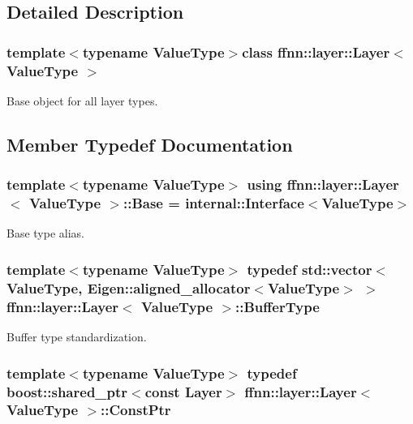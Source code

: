 \subsection{Detailed Description}
\subsubsection*{template$<$typename Value\-Type$>$class ffnn\-::layer\-::\-Layer$<$ Value\-Type $>$}

Base object for all layer types. 

\subsection{Member Typedef Documentation}
\hypertarget{classffnn_1_1layer_1_1_layer_a54b8c1b013fe141fbfc7f4dc63ab6882}{
\subsubsection[{Base}]{\setlength{\rightskip}{0pt plus 5cm}template$<$typename Value\-Type$>$ using {\bf ffnn\-::layer\-::\-Layer}$<$ Value\-Type $>$\-::{\bf Base} =  {\bf internal\-::\-Interface}$<$Value\-Type$>$}}\label{classffnn_1_1layer_1_1_layer_a54b8c1b013fe141fbfc7f4dc63ab6882}


Base type alias. 

\hypertarget{classffnn_1_1layer_1_1_layer_a3f2e9c375d9bcf80e6000e9e53ba212d}{
\subsubsection[{Buffer\-Type}]{\setlength{\rightskip}{0pt plus 5cm}template$<$typename Value\-Type$>$ typedef std\-::vector$<$Value\-Type, Eigen\-::aligned\-\_\-allocator$<$Value\-Type$>$ $>$ {\bf ffnn\-::layer\-::\-Layer}$<$ Value\-Type $>$\-::{\bf Buffer\-Type}}}\label{classffnn_1_1layer_1_1_layer_a3f2e9c375d9bcf80e6000e9e53ba212d}


Buffer type standardization. 

\hypertarget{classffnn_1_1layer_1_1_layer_aa1b22cc70a5ae0101cae5a9825043fbc}{
\subsubsection[{Const\-Ptr}]{\setlength{\rightskip}{0pt plus 5cm}template$<$typename Value\-Type$>$ typedef boost\-::shared\-\_\-ptr$<$const {\bf Layer}$>$ {\bf ffnn\-::layer\-::\-Layer}$<$ Value\-Type $>$\-::{\bf Const\-Ptr}}}\label{classffnn_1_1layer_1_1_layer_aa1b22cc70a5ae0101cae5a9825043fbc}


